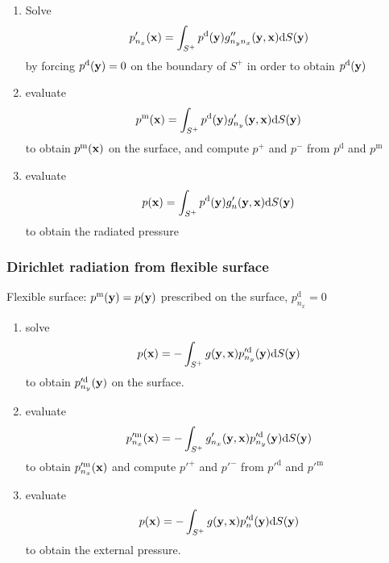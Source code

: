 \documentclass[10pt,onecolumn]{article}
\newcommand{\td}{\mathrm{d}}
\begin{document}
\begin{enumerate}
\item Solve
%
\begin{align}
p'_{n_x}({\bf x})
= \int_{S^+} p^{\mathrm{d}}({\bf y}) g''_{n_y n_x}({\bf y}, {\bf x}) \td S({\bf y})
\end{align}
%
by forcing $p^{\mathrm{d}}({\bf y}) = 0$ on the boundary of $S^+$ in order to obtain $p^{\mathrm{d}}({\bf y})$
\item evaluate
\begin{equation}
p^{\mathrm{m}}({\bf x}) = \int_{S^+} p^{\mathrm{d}}({\bf y}) g'_{n_y}({\bf y}, {\bf x}) \td S({\bf y})
\end{equation}
%
to obtain $p^{\mathrm{m}}({\bf x})$ on the surface, and compute $p^+$ and $p^-$ from $p^{\mathrm{d}}$ and $p^{\mathrm{m}}$
\item evaluate
%
\begin{equation}
p({\bf x})
= \int_{S^+} p^{\mathrm{d}}({\bf y}) g'_n({\bf y}, {\bf x}) \td S({\bf y})
\end{equation}
%
to obtain the radiated pressure
\end{enumerate}

\subsubsection{Dirichlet radiation from flexible surface}

Flexible surface: $p^{\mathrm{m}}({\bf y}) = p({\bf y})$ prescribed on the surface, $p^{\mathrm{d}}_{n_x} = 0$

\begin{enumerate}
\item solve
%
\begin{equation}
p({\bf x}) 
= -\int_{S^+} g({\bf y}, {\bf x}) p'^{\mathrm{d}}_{n_y}({\bf y}) \td S({\bf y})
\end{equation}
%
to obtain $p'^{\mathrm{d}}_{n_y}({\bf y})$ on the surface.
\item evaluate
%
\begin{equation}
p'^{\mathrm{m}}_{n_x}({\bf x}) = - \int_{S^+} g'_{n_x}({\bf y}, {\bf x}) p'^{\mathrm{d}}_{n_y}({\bf y}) \td S({\bf y})
\end{equation}
%
to obtain $p'^{\mathrm{m}}_{n_x}({\bf x})$ and compute $p'^+$ and $p'^-$ from $p'^{\mathrm{d}}$ and $p'^{\mathrm{m}}$
\item evaluate
%
\begin{align}
p({\bf x})
= -\int_{S^+} g({\bf y}, {\bf x}) p'^{\mathrm{d}}_n({\bf y}) \td S({\bf y})
\end{align}
%
to obtain the external pressure.

\end{enumerate}
\end{document}
